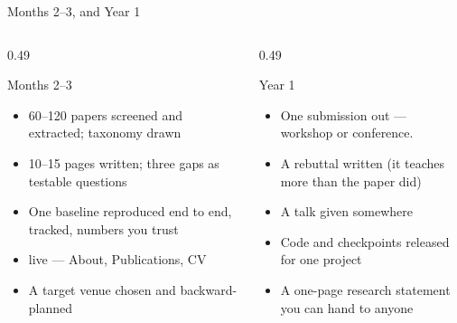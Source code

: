 \documentclass[aspectratio=169,11pt]{beamer}
\begin{document}
\begin{frame}{Months 2--3, and Year 1}
\begin{columns}[T]
\begin{column}{0.49\textwidth}
\begin{block}{Months 2--3}
\footnotesize
\begin{itemize}
  \item 60--120 papers screened and extracted; taxonomy drawn
  \item 10--15 pages written; three gaps as testable questions
  \item One baseline reproduced end to end, tracked, numbers you trust
  \item {} live --- About, Publications, CV
  \item A target venue chosen and backward-planned
\end{itemize}
\end{block}
\end{column}
\begin{column}{0.49\textwidth}
\begin{block}{Year 1}
\footnotesize
\begin{itemize}
  \item One submission out --- workshop or conference. 
  \item A rebuttal written (it teaches more than the paper did)
  \item A talk given somewhere
  \item Code and checkpoints released for one project
  \item A one-page research statement you can hand to anyone
\end{itemize}
\end{block}
\end{column}
\end{columns}
\end{frame}
\end{document}
